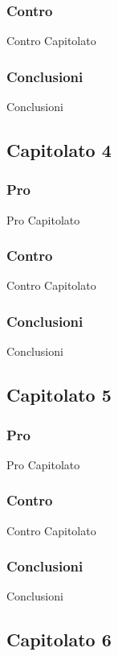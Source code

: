 \subsubsection{Contro}
Contro Capitolato

\subsubsection{Conclusioni}
Conclusioni

\subsection{Capitolato 4}

\subsubsection{Pro}
Pro Capitolato

\subsubsection{Contro}
Contro Capitolato

\subsubsection{Conclusioni}
Conclusioni

\subsection{Capitolato 5}

\subsubsection{Pro}
Pro Capitolato

\subsubsection{Contro}
Contro Capitolato

\subsubsection{Conclusioni}
Conclusioni

\subsection{Capitolato 6}

